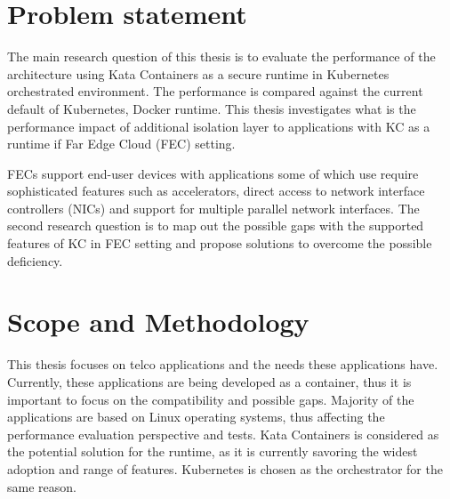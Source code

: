 \section{Problem statement}
\label{section:intro_problemstatement}

The main research question of this thesis is to evaluate the performance of the architecture using Kata Containers as a secure runtime in Kubernetes orchestrated environment. The performance is compared against the current default of Kubernetes, Docker runtime. This thesis investigates what is the performance impact of additional isolation layer to applications with KC as a runtime if Far Edge Cloud (FEC) setting.

FECs support end-user devices with applications some of which use require sophisticated features such as accelerators, direct access to network interface controllers (NICs) and support for multiple parallel network interfaces. The second research question is to map out the possible gaps with the supported features of KC in FEC setting and propose solutions to overcome the possible deficiency.





\section{Scope and Methodology}
\label{section:intro_scopemethodology}

This thesis focuses on telco applications and the needs these applications have. Currently, these applications are being developed as a container, thus it is important to focus on the compatibility and possible gaps. Majority of the applications are based on Linux operating systems, thus affecting the performance evaluation perspective and tests. Kata Containers is considered as the potential solution for the runtime, as it is currently savoring the widest adoption and range of features. Kubernetes is chosen as the orchestrator for the same reason.

